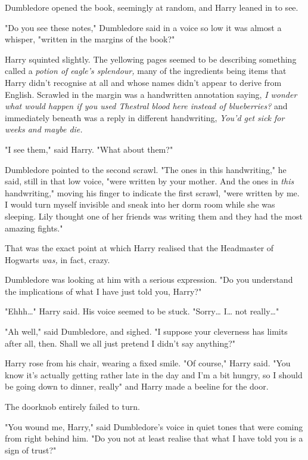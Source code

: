 Dumbledore opened the book, seemingly at random, and Harry leaned in to see.

"Do you see these notes," Dumbledore said in a voice so low it was almost a
whisper, "written in the margins of the book?"

Harry squinted slightly. The yellowing pages seemed to be describing something
called a \emph{potion of eagle's splendour,} many of the ingredients being
items that Harry didn't recognise at all and whose names didn't appear to
derive from English. Scrawled in the margin was a handwritten annotation
saying, \emph{I wonder what would happen if you used Thestral blood here
instead of blueberries?} and immediately beneath was a reply in different
handwriting, \emph{You'd get sick for weeks and maybe die.}

"I see them," said Harry. "What about them?"

Dumbledore pointed to the second scrawl. "The ones in this handwriting," he
said, still in that low voice, "were written by your mother. And the ones in
\emph{this} handwriting," moving his finger to indicate the first scrawl, "were
written by me. I would turn myself invisible and sneak into her dorm room while
she was sleeping. Lily thought one of her friends was writing them and they had
the most amazing fights."

That was the exact point at which Harry realised that the Headmaster of
Hogwarts \emph{was,} in fact, crazy.

Dumbledore was looking at him with a serious expression. "Do you understand the
implications of what I have just told you, Harry?"

"Ehhh{\ldots}" Harry said. His voice seemed to be stuck. "Sorry{\ldots}
I{\ldots} not really{\ldots}"

"Ah well," said Dumbledore, and sighed. "I suppose your cleverness has limits
after all, then. Shall we all just pretend I didn't say anything?"

Harry rose from his chair, wearing a fixed smile. "Of course," Harry said. "You
know it's actually getting rather late in the day and I'm a bit hungry, so I
should be going down to dinner, really" and Harry made a beeline for the door.

The doorknob entirely failed to turn.

"You wound me, Harry," said Dumbledore's voice in quiet tones that were coming
from right behind him. "Do you not at least realise that what I have told you
is a sign of trust?"


